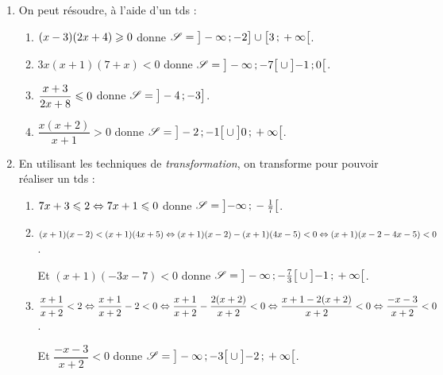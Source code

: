 \documentclass[a4paper,11pt]{article}
\begin{document}
\medskip


\begin{enumerate}
	\item On peut résoudre, à l'aide d'un tds :
	\begin{enumerate}
		\item $(x-3)(2x+4) \geqslant 0$  donne $\mathscr{S} = \mbox{\ensuremath{\left]\strut-\infty\mathpunct{};-2\right]}} \cup \mbox{\ensuremath{\left[3\mathpunct{};\strut+\infty\right[}}$.
		\item $3x(x+1)(7+x) < 0$ donne $\mathscr{S} = \mbox{\ensuremath{\left]\strut-\infty\mathpunct{};-7\right[}} \cup \mbox{\ensuremath{\left]-1\mathpunct{};\strut 0\right[}}$.
		\item $\dfrac{x+3}{2x+8} \leqslant 0$ donne $\mathscr{S} = \mbox{\ensuremath{\left]\strut-4\mathpunct{};-3\right]}}$.
		\item $\dfrac{x(x+2)}{x+1} > 0$ donne $\mathscr{S} = \mbox{\ensuremath{\left]\strut-2\mathpunct{};-1\right[}} \cup \mbox{\ensuremath{\left]0\mathpunct{};\strut+\infty\right[}}$.
	\end{enumerate}
	\item En utilisant les techniques de \textit{transformation}, on transforme pour pouvoir réaliser un tds :
	\begin{enumerate}
		\item $7x+3 \leqslant 2 \Leftrightarrow 7x+1 \leqslant 0$ donne $\mathscr{S} = \mbox{\ensuremath{\left]-\infty\mathpunct{};\strut-\tfrac{1}{7}\right[}}$.
		\item $(x+1)(x-2) < (x+1)(4x+5) \Leftrightarrow (x+1)(x-2)-(x+1)(4x-5) < 0 \Leftrightarrow (x+1)(x-2-4x-5) < 0$.
		
		Et $(x+1)(-3x-7) < 0$ donne $\mathscr{S} = \mbox{\ensuremath{\left]\strut-\infty\mathpunct{};-\tfrac{7}{3}\right[}} \cup \mbox{\ensuremath{\left]-1\mathpunct{};\strut+\infty\right[}}$.
		\item $\dfrac{x+1}{x+2} < 2 \Leftrightarrow \dfrac{x+1}{x+2} - 2 < 0 \Leftrightarrow \dfrac{x+1}{x+2} - \dfrac{2(x+2)}{x+2} < 0 \Leftrightarrow \dfrac{x+1-2(x+2)}{x+2} < 0 \Leftrightarrow \dfrac{-x-3}{x+2} < 0$.
		
		Et $\dfrac{-x-3}{x+2} < 0$ donne $\mathscr{S} = \mbox{\ensuremath{\left]\strut-\infty\mathpunct{};-3\right[}} \cup \mbox{\ensuremath{\left]-2\mathpunct{};\strut+\infty\right[}}$.
	\end{enumerate}
\end{enumerate}
\end{document}
